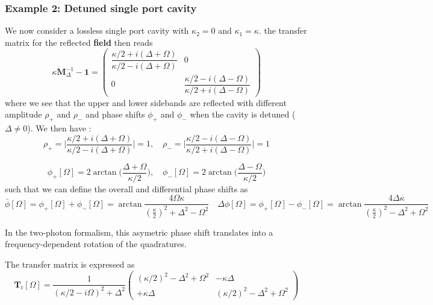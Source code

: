 \subsubsection{Example 2: Detuned single port cavity }
We now consider a lossless single port cavity with $\kappa_2 = 0$ and $\kappa_1 = \kappa$. the transfer matrix for the reflected \textbf{field} then reads
\begin{equation*}
    \kappa \mathbf{M}^{-1}_\Delta - \mathbf{1} = \begin{pmatrix}
      \dfrac{\kappa/2 + i(\Delta + \Omega)}{\kappa/2 - i(\Delta + \Omega)} & 0 \\[10pt]
      0 & \dfrac{\kappa/2 - i(\Delta - \Omega)}{\kappa/2+ i(\Delta - \Omega)}
    \end{pmatrix}
\end{equation*}
where we see that the upper and lower sidebands are reflected with different amplitude $\rho_+$ and $\rho_-$ and phase shifts $\phi_+$ and $\phi_-$ when the cavity is detuned ($\Delta \neq 0$). We then have : 
\begin{equation}
    \rho_{+} = \Big|\dfrac{\kappa/2 + i(\Delta + \Omega)}{\kappa/2 - i(\Delta + \Omega)}\Big| = 1, \quad \rho_{-} = \Big|\dfrac{\kappa/2 - i(\Delta - \Omega)}{\kappa/2 + i(\Delta - \Omega)}\Big| = 1
\end{equation}

\begin{equation}
    \phi_{+}[\Omega] = 2 \arctan \Big(\dfrac{\Delta + \Omega}{\kappa/2}\Big), \quad \phi_{-}[\Omega] = 2 \arctan \Big(\dfrac{\Delta - \Omega}{\kappa/2}\Big)
\end{equation}
such that we can define the overall and differential phase shifts as
\begin{equation}
    \bar \phi[\Omega] = \phi_{+}[\Omega] + \phi_{-}[\Omega] = \arctan \dfrac{4 \Omega \kappa}{(\frac{\kappa}{2})^2 + \Delta^2 - \Omega^2} \quad \Delta \phi[\Omega] = \phi_{+}[\Omega] - \phi_{-}[\Omega] = \arctan \dfrac{4 \Delta \kappa}{(\frac{\kappa}{2})^2 - \Delta^2 + \Omega^2}
\end{equation}

In the two-photon formalism, this asymetric phase shift translates into a frequency-dependent rotation of the quadratures.






The transfer matrix is expressed as 
\begin{equation}
  \mathbf{T}_{\mathrm{r}}[\Omega]=  \frac{1}{(\kappa/2 - i\Omega)^{2}+\Delta^{2}}
\begin{pmatrix}
     (\kappa/2)^2 - \Delta^2 + \Omega^2  & - \kappa \Delta  \\[6pt]
    + \kappa \Delta  & ( \kappa/2)^2 - \Delta^2 + \Omega^2 
\end{pmatrix}
\end{equation}

